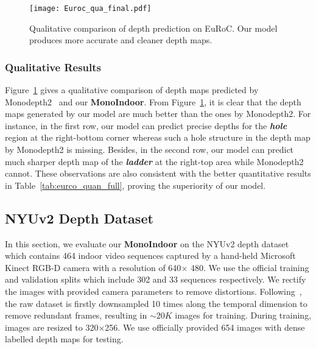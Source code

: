 \begin{figure}[!t]
\begin{center}
\texttt{[image: Euroc\_qua\_final.pdf]}
\end{center}
\caption{Qualitative comparison of depth prediction on EuRoC. Our model produces more accurate and cleaner depth maps.}
\label{fig:euroc_qua_full}
\end{figure}

\subsubsection{Qualitative Results}
Figure~\ref{fig:euroc_qua_full} gives a qualitative comparison of depth maps predicted by Monodepth2~\cite{godard2019digging} and our \textbf{MonoIndoor}. From Figure~\ref{fig:euroc_qua_full}, it is clear that the depth maps generated by our model are much better than the ones by Monodepth2. For instance, in the first row, our model can predict precise depths for the \textbf{\textit{hole}} region at the right-bottom corner whereas such a hole structure in the depth map by Monodepth2 is missing. Besides, in the second row, our model can predict much sharper depth map of the \textit{\textbf{ladder}} at the right-top area while Monodepth2 cannot. These observations are also consistent with the better quantitative results in Table~\ref{tab:eurco_quan_full}, proving the superiority of our model. 





\subsection{NYUv2 Depth Dataset}
In this section, we evaluate our \textbf{MonoIndoor} on the NYUv2 depth dataset~\cite{Silberman:ECCV12} which contains 464 indoor video sequences captured by a hand-held Microsoft Kinect RGB-D camera with a resolution of 640$\times$ 480. We use the official training and validation splits which include 302 and 33 sequences respectively. We rectify the images with provided camera parameters to remove distortions. Following~\cite{zhao2020towards, bian2020unsupervised}, the raw dataset is firstly downsampled 10 times along the temporal dimension to remove redundant frames, resulting in $\sim20K$ images for training. During training, images are resized to 320$\times$256. We use officially provided 654 images with dense labelled depth maps for testing.

